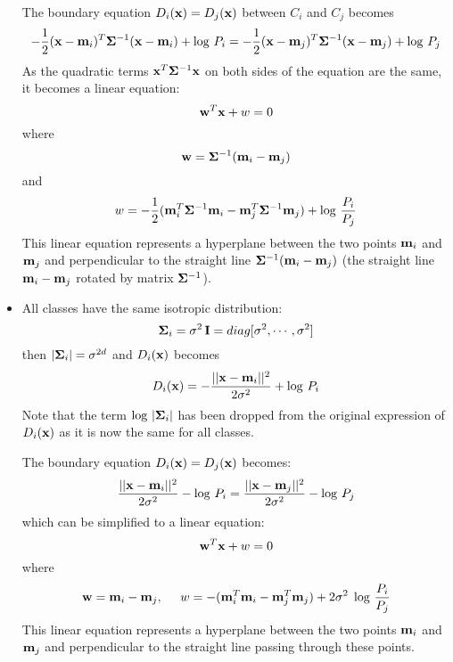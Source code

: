\documentclass{article}
\begin{document}
\begin{itemize}
  The boundary equation $D_i({\bf x})=D_j({\bf x})$ between $C_i$ and $C_j$
  becomes
  \begin{equation} 
    -\frac{1}{2}({\bf x}-{\bf m}_i)^T{\bf\Sigma}^{-1}({\bf x}-{\bf m}_i)+\log\,P_i
    =-\frac{1}{2}({\bf x}-{\bf m}_j)^T{\bf\Sigma}^{-1}({\bf x}-{\bf m}_j)+\log\,P_j 
  \end{equation}
  As the quadratic terms ${\bf x}^T{\bf\Sigma}^{-1}{\bf x}$ on both sides
  of the equation are the same, it becomes a linear equation:
  \begin{equation}
    {\bf w}^T{\bf x}+w=0	
    \label{LDF}
  \end{equation}
  where
  \begin{equation}
    {\bf w}={\bf \Sigma}^{-1}({\bf m}_i-{\bf m}_j)	
  \end{equation}
  and 
  \begin{equation}
    w=-\frac{1}{2}({\bf m}_i^T{\bf \Sigma}^{-1}{\bf m}_i
    -{\bf m}_j^T{\bf \Sigma}^{-1}{\bf m}_j)+\log\,\frac{P_i}{P_j}	
  \end{equation}
  This linear equation represents a hyperplane between the two points
  ${\bf m}_i$ and ${\bf m}_j$ and perpendicular to the straight line
  ${\bf \Sigma}^{-1}({\bf m}_i-{\bf m}_j)$
  (the straight line ${\bf m}_i-{\bf m}_j$ rotated by matrix ${\bf \Sigma}^{-1}$).

\item All classes have the same isotropic distribution:
  \begin{equation}
    {\bf \Sigma}_i={\bf \sigma}^2\,{\bf I}=diag[\sigma^2,\cdots,\sigma^2]	
  \end{equation}
  then $|{\bf \Sigma}_i|=\sigma^{2d}$ and $D_i({\bf x})$ becomes
  \begin{equation}
    D_i({\bf x})=-\frac{|| {\bf x}-{\bf m}_i ||^2}{2\sigma^2}+\log\,P_i 
  \end{equation}
  Note that the term $\log\,|{\bf \Sigma}_i|$ has been dropped from the original 
  expression of $D_i({\bf x})$ as it is now the same for all classes.

  The boundary equation $D_i({\bf x})=D_j({\bf x})$ becomes:
  \begin{equation}
    \frac{|| {\bf x}-{\bf m}_i ||^2}{2\sigma^2}-\log\,P_i
    =\frac{|| {\bf x}-{\bf m}_j ||^2}{2\sigma^2}-\log\,P_j 
  \end{equation}
  which can be simplified to a linear equation:
  \begin{equation}
    {\bf w}^T{\bf x}+w=0
  \end{equation}
  where
  \begin{equation}
    {\bf w}={\bf m}_i-{\bf m}_j,\;\;\;\;\;
    w=-({\bf m}_i^T{\bf m}_i-{\bf m}_j^T{\bf m}_j)+2\sigma^2\;\log\,\frac{P_i}{P_j}
  \end{equation}
  This linear equation represents a hyperplane between the two points ${\bf m}_i$ 
  and ${\bf m}_j$ and perpendicular to the straight line passing through these
  points.


\end{itemize}
\end{document}
